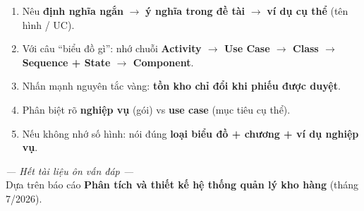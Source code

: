 \documentclass[12pt,a4paper]{article}
\begin{document}
\vspace{8pt}
\begin{tcolorbox}[colback=yellow!8, colframe=qblue, title=\textbf{Mẹo trả lời vấn đáp}]
\begin{enumerate}[leftmargin=1.4em,itemsep=3pt]
  \item Nêu \textbf{định nghĩa ngắn} $\rightarrow$ \textbf{ý nghĩa trong đề tài} $\rightarrow$ \textbf{ví dụ cụ thể} (tên hình / UC).
  \item Với câu ``biểu đồ gì'': nhớ chuỗi \textbf{Activity $\rightarrow$ Use Case $\rightarrow$ Class $\rightarrow$ Sequence + State $\rightarrow$ Component}.
  \item Nhấn mạnh nguyên tắc vàng: \textbf{tồn kho chỉ đổi khi phiếu được duyệt}.
  \item Phân biệt rõ \textbf{nghiệp vụ} (gói) vs \textbf{use case} (mục tiêu cụ thể).
  \item Nếu không nhớ số hình: nói đúng \textbf{loại biểu đồ + chương + ví dụ nghiệp vụ}.
\end{enumerate}
\end{tcolorbox}

\vspace{12pt}
\begin{center}
\textit{--- Hết tài liệu ôn vấn đáp ---}\\[4pt]
{\small Dựa trên báo cáo \textbf{Phân tích và thiết kế hệ thống quản lý kho hàng} (tháng 7/2026).}
\end{center}
\end{document}
